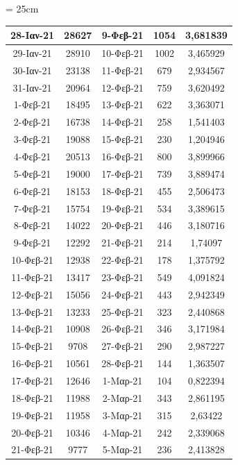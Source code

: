 \documentclass{article}
\begin{document}
\begin{table}{\textheight = 25cm}
{\begin{tabular}{|c|c|c|c|c|}
                28-Ιαν-21 & 28627 & 9-Φεβ-21 & 1054 & 3,681839 \\ \hline
                29-Ιαν-21 & 28910 & 10-Φεβ-21 & 1002 & 3,465929 \\ \hline
                30-Ιαν-21 & 23138 & 11-Φεβ-21 & 679 & 2,934567 \\ \hline
                31-Ιαν-21 & 20964 & 12-Φεβ-21 & 759 & 3,620492 \\ \hline
                1-Φεβ-21 & 18495 & 13-Φεβ-21 & 622 & 3,363071 \\ \hline
                2-Φεβ-21 & 16738 & 14-Φεβ-21 & 258 & 1,541403 \\ \hline
                3-Φεβ-21 & 19088 & 15-Φεβ-21 & 230 & 1,204946 \\ \hline
                4-Φεβ-21 & 20513 & 16-Φεβ-21 & 800 & 3,899966 \\ \hline
                5-Φεβ-21 & 19000 & 17-Φεβ-21 & 739 & 3,889474 \\ \hline
                6-Φεβ-21 & 18153 & 18-Φεβ-21 & 455 & 2,506473 \\ \hline
                7-Φεβ-21 & 15754 & 19-Φεβ-21 & 534 & 3,389615 \\ \hline
                8-Φεβ-21 & 14022 & 20-Φεβ-21 & 446 & 3,180716 \\ \hline
                9-Φεβ-21 & 12292 & 21-Φεβ-21 & 214 & 1,74097 \\ \hline
                10-Φεβ-21 & 12938 & 22-Φεβ-21 & 178 & 1,375792 \\ \hline
                11-Φεβ-21 & 13417 & 23-Φεβ-21 & 549 & 4,091824 \\ \hline
                12-Φεβ-21 & 15056 & 24-Φεβ-21 & 443 & 2,942349 \\ \hline
                13-Φεβ-21 & 13233 & 25-Φεβ-21 & 323 & 2,440868 \\ \hline
                14-Φεβ-21 & 10908 & 26-Φεβ-21 & 346 & 3,171984 \\ \hline
                15-Φεβ-21 & 9708 & 27-Φεβ-21 & 290 & 2,987227 \\ \hline
                16-Φεβ-21 & 10561 & 28-Φεβ-21 & 144 & 1,363507 \\ \hline
                17-Φεβ-21 & 12646 & 1-Μαρ-21 & 104 & 0,822394 \\ \hline
                18-Φεβ-21 & 11988 & 2-Μαρ-21 & 343 & 2,861195 \\ \hline
                19-Φεβ-21 & 11958 & 3-Μαρ-21 & 315 & 2,63422 \\ \hline
                20-Φεβ-21 & 10346 & 4-Μαρ-21 & 242 & 2,339068 \\ \hline
                21-Φεβ-21 & 9777 & 5-Μαρ-21 & 236 & 2,413828 \\ \hline
            \end{tabular}%
            }
        \end{table}
\end{document}
